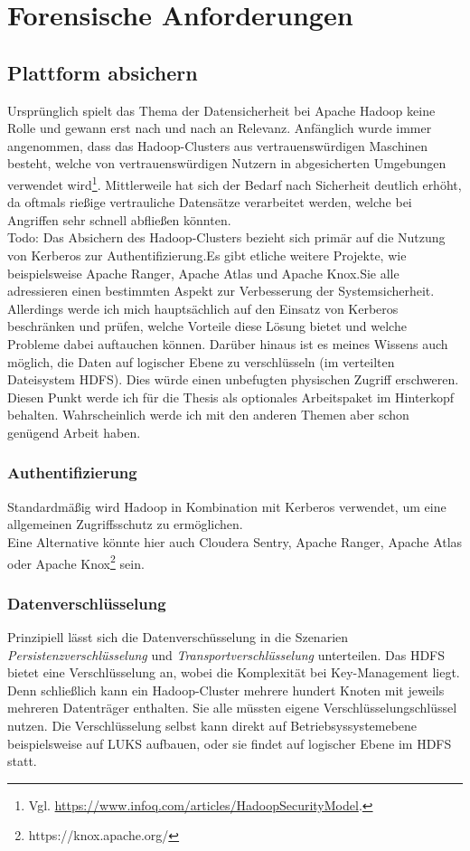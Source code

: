 \chapter{Forensische Anforderungen}

\section{Plattform absichern}
Ursprünglich spielt das Thema der Datensicherheit bei Apache Hadoop keine Rolle und gewann erst nach und nach an Relevanz. Anfänglich wurde immer angenommen, dass das Hadoop-Clusters aus vertrauenswürdigen Maschinen besteht, welche von vertrauenswürdigen Nutzern in abgesicherten Umgebungen verwendet wird\footnote{Vgl. \url{https://www.infoq.com/articles/HadoopSecurityModel}.}. Mittlerweile hat sich der Bedarf nach Sicherheit deutlich erhöht, da oftmals rießige vertrauliche Datensätze verarbeitet werden, welche bei Angriffen sehr schnell abfließen könnten.\\

\noindent
Todo:
Das Absichern des Hadoop-Clusters bezieht sich primär auf die Nutzung von Kerberos zur Authentifizierung.Es gibt etliche weitere Projekte, wie beispielsweise Apache Ranger, Apache Atlas und Apache Knox.Sie alle adressieren einen bestimmten Aspekt zur Verbesserung der Systemsicherheit. Allerdings werde ich mich hauptsächlich auf den Einsatz von Kerberos beschränken und prüfen, welche Vorteile diese Lösung bietet und welche Probleme dabei auftauchen können. Darüber hinaus ist es meines Wissens auch möglich, die Daten auf logischer Ebene zu verschlüsseln (im verteilten Dateisystem HDFS). Dies würde einen unbefugten physischen Zugriff erschweren. Diesen Punkt werde ich für die Thesis als optionales Arbeitspaket im Hinterkopf behalten. Wahrscheinlich werde ich mit den anderen Themen aber schon genügend Arbeit haben. 
\subsection{Authentifizierung}
Standardmäßig wird Hadoop in Kombination mit Kerberos verwendet, um eine allgemeinen Zugriffsschutz zu ermöglichen.\cite{hadoop_security}\\
Eine Alternative könnte hier auch Cloudera Sentry, Apache Ranger, Apache Atlas oder Apache Knox\footnote{https://knox.apache.org/} sein.
\subsection{Datenverschlüsselung}
Prinzipiell lässt sich die Datenverschüsselung in die Szenarien \textit{Persistenzverschlüsselung} und \textit{Transportverschlüsselung} unterteilen. Das HDFS bietet eine Verschlüsselung an, wobei die Komplexität bei Key-Management liegt. Denn schließlich kann ein Hadoop-Cluster mehrere hundert Knoten mit jeweils mehreren Datenträger enthalten. Sie alle müssten eigene Verschlüsselungschlüssel nutzen. Die Verschlüsselung selbst kann direkt auf Betriebsyssystemebene beispielsweise auf LUKS aufbauen, oder sie findet auf logischer Ebene im HDFS statt.\cite{hadoop_security}\\

